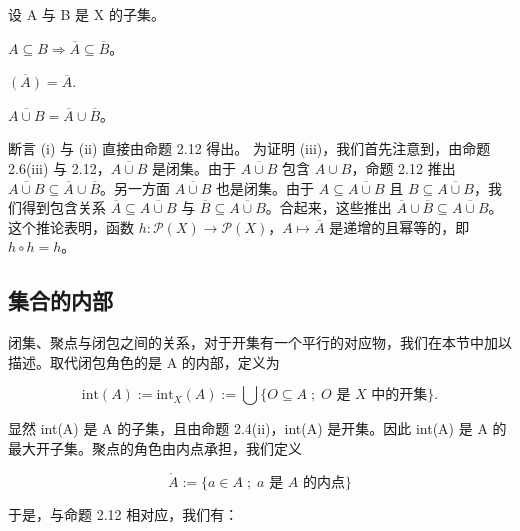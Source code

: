 \begin{corollary}

设 A 与 B 是 X 的子集。

\begin{subitems}
\item

$ A \subseteq B \Rightarrow \overline{A} \subseteq \overline{B} $。

\item

$ \overline{(A)}=\overline{A}. $

\item

$ \overline{A \cup B} = \overline{A} \cup \overline{B} $。

\proofhead
断言 (i) 与 (ii) 直接由命题 2.12 得出。
为证明 (iii)，我们首先注意到，由命题 2.6(iii) 与 2.12，$ \overline{A \cup B} $ 是闭集。由于 $ \overline{A \cup B} $ 包含 $ A \cup B $，命题 2.12 推出 $ \overline{A \cup B} \subseteq \overline{A} \cup \overline{B} $。另一方面 $ \overline{A \cup B} $ 也是闭集。由于 $ A \subseteq \overline{A \cup B} $ 且 $ B \subseteq \overline{A \cup B} $，我们得到包含关系 $ \overline{A} \subseteq \overline{A \cup B} $ 与 $ \overline{B} \subseteq \overline{A \cup B} $。合起来，这些推出 $ \overline{A} \cup \overline{B} \subseteq \overline{A \cup B} $。
这个推论表明，函数 $ h: \mathcal{P}(X) \to \mathcal{P}(X) $，$ A \mapsto \overline{A} $ 是递增的且幂等的，即 $ h \circ h = h $。
\end{subitems}

\end{corollary}

\subsection*{集合的内部}

闭集、聚点与闭包之间的关系，对于开集有一个平行的对应物，我们在本节中加以描述。取代闭包角色的是 A 的内部，定义为

\[
\mathrm{i n t}(A):=\mathrm{i n t}_{X}(A):=\bigcup\{O\subseteq A\;;\;O\text{ 是 }X\text{ 中的开集}\}.
\]

显然 int(A) 是 A 的子集，且由命题 2.4(ii)，int(A) 是开集。因此 int(A) 是 A 的最大开子集。聚点的角色由内点承担，我们定义

\[
\mathring{A}:=\{a\in A\;;\;a\text{ 是 }A\text{ 的内点}\}
\]

于是，与命题 2.12 相对应，我们有：

